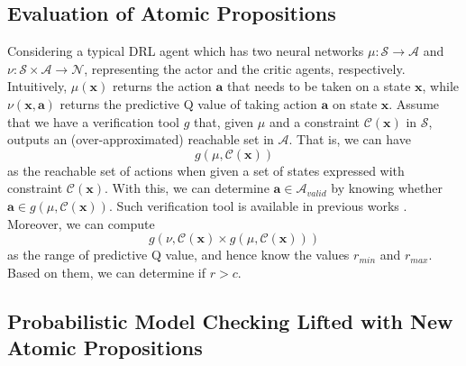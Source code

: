 \subsection*{Evaluation of Atomic Propositions}

Considering a typical DRL agent which has two neural networks $\mu: \mathcal{S}\rightarrow \mathcal{A}$ and $\nu: \mathcal{S}\times \mathcal{A} \rightarrow \mathcal{N}$, representing the actor and the critic agents, respectively. Intuitively, $\mu(\textbf{x})$ returns the action $\textbf{a}$ that needs to be taken on a state $\textbf{x}$, while $\nu(\textbf{x},\textbf{a})$ returns the predictive Q value of taking action $\textbf{a}$ on state $\textbf{x}$. Assume that we have a verification tool $g$ that, given $\mu$ and a constraint $\mathcal{C}(\textbf{x})$ in $\mathcal{S}$, outputs an (over-approximated) reachable set in 
$\mathcal{A}$. That is, we can have 
\begin{equation}\label{equ:reachableactions}
    g(\mu,\mathcal{C}(\textbf{x})) 
\end{equation}
as the reachable set of actions when given a set of states expressed with constraint $\mathcal{C}(\textbf{x})$. With this, we can determine $\textbf{a}\in \mathcal{A}_{valid}$ by knowing whether $\textbf{a}\in g(\mu,\mathcal{C}(\textbf{x})) $.
Such verification tool is available \cite{HUANG2020100270} in previous works \cite{RHK2018,wu2018game,10.1007/978-3-030-32304-2_15}. Moreover, we can compute 
\begin{equation}\label{equ:reachablestates}
    g(\nu,\mathcal{C}(\textbf{x})\times g(\mu,\mathcal{C}(\textbf{x})))
\end{equation}
as the range of predictive Q value, and hence know the values $r_{min}$ and $r_{max}$. Based on them, we can determine if $r>c$.  




\subsection*{Probabilistic Model Checking Lifted with New Atomic Propositions}




